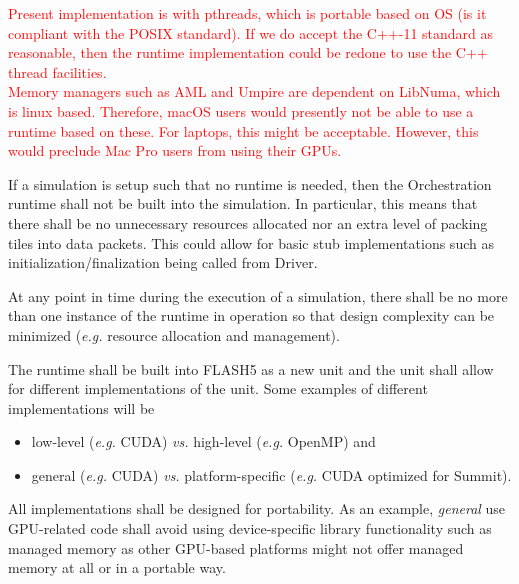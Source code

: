\documentclass{article}
\begin{document}
\textcolor{red}{Present implementation is with pthreads, which is portable based
on OS (is it compliant with the POSIX standard).  If we do accept the C++-11
standard as reasonable, then the runtime implementation could be redone to use
the C++ thread facilities.}\\

\textcolor{red}{Memory managers such as AML and Umpire are dependent on
LibNuma, which is linux based.  Therefore, macOS users would presently not be
able to use a runtime based on these.  For laptops, this might be acceptable.
However, this would preclude Mac Pro users from using their GPUs.}

\begin{req}
If a simulation is setup such that no runtime is needed, then the Orchestration
runtime shall not be built into the simulation.  In particular, this means that
there shall be no unnecessary resources allocated nor an extra level of packing
tiles into data packets.  This could allow for basic stub implementations such
as initialization/finalization being called from Driver.
\end{req}

\begin{req}
At any point in time during the execution of a simulation, there shall be no more
than one instance of the runtime in operation so that design complexity can
be minimized (\textit{e.g.} resource allocation and management).
\end{req}

\begin{req}
\label{req:UnitImplementations}
The runtime shall be built into FLASH5 as a new unit and the unit shall allow
for different implementations of the unit.  Some examples of different
implementations will be
\begin{itemize}
\item{low-level (\textit{e.g.} CUDA) \textit{vs.} high-level
(\textit{e.g.} OpenMP) and}
\item{general (\textit{e.g.} CUDA) \textit{vs.}} platform-specific
(\textit{e.g.} CUDA optimized for Summit).
\end{itemize}
\end{req}

\begin{req}
All implementations shall be designed for portability.  As an example,
\textit{general} use GPU-related code shall avoid using device-specific library
functionality such as managed memory as other GPU-based platforms might not
offer managed memory at all or in a portable way.
\end{req}
\end{document}
